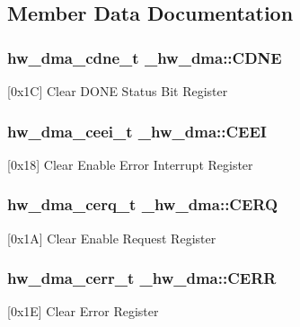 \subsection{Member Data Documentation}
\subsubsection[{\texorpdfstring{C\+D\+NE}{CDNE}}]{ {\bf hw\+\_\+dma\+\_\+cdne\+\_\+t} \+\_\+hw\+\_\+dma\+::\+C\+D\+NE}\hypertarget{struct__hw__dma_a682f24fa9d2d6b6c5e4b7ae9c8cdd8b8}{}\label{struct__hw__dma_a682f24fa9d2d6b6c5e4b7ae9c8cdd8b8}
\mbox{[}0x1C\mbox{]} Clear D\+O\+NE Status Bit Register 
\subsubsection[{\texorpdfstring{C\+E\+EI}{CEEI}}]{ {\bf hw\+\_\+dma\+\_\+ceei\+\_\+t} \+\_\+hw\+\_\+dma\+::\+C\+E\+EI}\hypertarget{struct__hw__dma_a2d5c1ddc73520d610daf72212c103543}{}\label{struct__hw__dma_a2d5c1ddc73520d610daf72212c103543}
\mbox{[}0x18\mbox{]} Clear Enable Error Interrupt Register 
\subsubsection[{\texorpdfstring{C\+E\+RQ}{CERQ}}]{ {\bf hw\+\_\+dma\+\_\+cerq\+\_\+t} \+\_\+hw\+\_\+dma\+::\+C\+E\+RQ}\hypertarget{struct__hw__dma_a81e906c270ddfdc8ac1aa5197987ebfb}{}\label{struct__hw__dma_a81e906c270ddfdc8ac1aa5197987ebfb}
\mbox{[}0x1A\mbox{]} Clear Enable Request Register 
\subsubsection[{\texorpdfstring{C\+E\+RR}{CERR}}]{ {\bf hw\+\_\+dma\+\_\+cerr\+\_\+t} \+\_\+hw\+\_\+dma\+::\+C\+E\+RR}\hypertarget{struct__hw__dma_aa7035b6364ac7e6dd2744c8ba9bb674c}{}\label{struct__hw__dma_aa7035b6364ac7e6dd2744c8ba9bb674c}
\mbox{[}0x1E\mbox{]} Clear Error Register 
